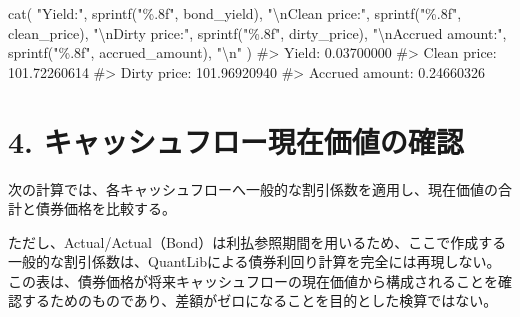 \documentclass[
  letterpaper,
  DIV=11,
  numbers=noendperiod]{scrreprt}
\newenvironment{Shaded}{\begin{snugshade}}{\end{snugshade}}
\newcommand{\CommentTok}[1]{\textcolor[rgb]{0.37,0.37,0.37}{#1}}
\newcommand{\FunctionTok}[1]{\textcolor[rgb]{0.28,0.35,0.67}{#1}}
\newcommand{\NormalTok}[1]{\textcolor[rgb]{0.00,0.23,0.31}{#1}}
\newcommand{\SpecialCharTok}[1]{\textcolor[rgb]{0.37,0.37,0.37}{#1}}
\newcommand{\StringTok}[1]{\textcolor[rgb]{0.13,0.47,0.30}{#1}}
\begin{document}
\begin{Shaded}
\begin{Highlighting}[]
\FunctionTok{cat}\NormalTok{(}
  \StringTok{"Yield:"}\NormalTok{,}
  \FunctionTok{sprintf}\NormalTok{(}\StringTok{"\%.8f"}\NormalTok{, bond\_yield),}
  \StringTok{"}\SpecialCharTok{\textbackslash{}n}\StringTok{Clean price:"}\NormalTok{,}
  \FunctionTok{sprintf}\NormalTok{(}\StringTok{"\%.8f"}\NormalTok{, clean\_price),}
  \StringTok{"}\SpecialCharTok{\textbackslash{}n}\StringTok{Dirty price:"}\NormalTok{,}
  \FunctionTok{sprintf}\NormalTok{(}\StringTok{"\%.8f"}\NormalTok{, dirty\_price),}
  \StringTok{"}\SpecialCharTok{\textbackslash{}n}\StringTok{Accrued amount:"}\NormalTok{,}
  \FunctionTok{sprintf}\NormalTok{(}\StringTok{"\%.8f"}\NormalTok{, accrued\_amount),}
  \StringTok{"}\SpecialCharTok{\textbackslash{}n}\StringTok{"}
\NormalTok{)}
\CommentTok{\#\textgreater{} Yield: 0.03700000 }
\CommentTok{\#\textgreater{} Clean price: 101.72260614 }
\CommentTok{\#\textgreater{} Dirty price: 101.96920940 }
\CommentTok{\#\textgreater{} Accrued amount: 0.24660326}
\end{Highlighting}
\end{Shaded}

\section{4.
キャッシュフロー現在価値の確認}\label{ux30adux30e3ux30c3ux30b7ux30e5ux30d5ux30edux30fcux73feux5728ux4fa1ux5024ux306eux78baux8a8d}

次の計算では、各キャッシュフローへ一般的な割引係数を適用し、現在価値の合計と債券価格を比較する。

ただし、Actual/Actual（Bond）は利払参照期間を用いるため、ここで作成する一般的な割引係数は、QuantLibによる債券利回り計算を完全には再現しない。この表は、債券価格が将来キャッシュフローの現在価値から構成されることを確認するためのものであり、差額がゼロになることを目的とした検算ではない。
\end{document}
